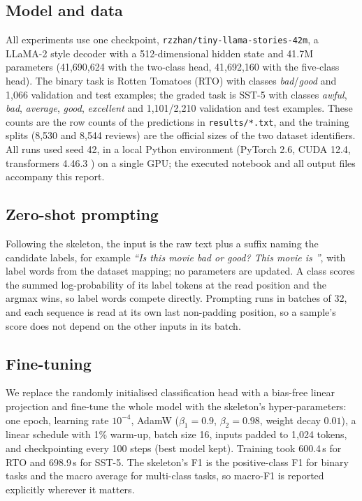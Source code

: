 \documentclass[11pt]{article}
\begin{document}
\subsection{Model and data}
All experiments use one checkpoint, \texttt{rzzhan/tiny-llama-stories-42m}, a LLaMA-2 style
decoder with a 512-dimensional hidden state and 41.7M parameters (41{,}690{,}624 with the
two-class head, 41{,}692{,}160 with the five-class head). The binary task is Rotten
Tomatoes (RTO) with classes \emph{bad}/\emph{good} and 1{,}066 validation and test examples; the
graded task is SST-5 \citep{socher-etal-2013-recursive} with classes \emph{awful}, \emph{bad},
\emph{average}, \emph{good}, \emph{excellent} and 1{,}101/2{,}210 validation and test examples.
These counts are the row counts of the predictions in \texttt{results/*.txt}, and the training
splits (8{,}530 and 8{,}544 reviews) are the official sizes of the two dataset identifiers. All runs used seed 42, in a local Python environment
(PyTorch 2.6, CUDA 12.4, transformers 4.46.3 \citep{wolf-etal-2020-transformers}) on a single
GPU; the executed notebook and all output files accompany this report.

\subsection{Zero-shot prompting}
Following the skeleton, the input is the raw text plus a suffix naming the candidate labels,
for example \textit{``Is this movie bad or good? This movie is ''}, with label words from the
dataset mapping; no parameters are updated. A class scores the summed log-probability of its
label tokens at the read position and the argmax wins, so label words compete directly.
Prompting runs in batches of 32, and each sequence is read at its own last non-padding position,
so a sample's score does not depend on the other inputs in its batch.

\subsection{Fine-tuning}
We replace the randomly initialised classification head with a bias-free linear projection and
fine-tune the whole model with the skeleton's hyper-parameters: one epoch, learning rate
$10^{-4}$, AdamW ($\beta_1{=}0.9$, $\beta_2{=}0.98$, weight decay $0.01$), a linear schedule
with 1\% warm-up, batch size 16, inputs padded to 1{,}024 tokens, and checkpointing every 100
steps (best model kept). Training took 600.4\,s for RTO and 698.9\,s for SST-5. The skeleton's F1 is the
positive-class F1 for binary tasks and the macro average for multi-class tasks, so macro-F1 is
reported explicitly wherever it matters.
\end{document}
